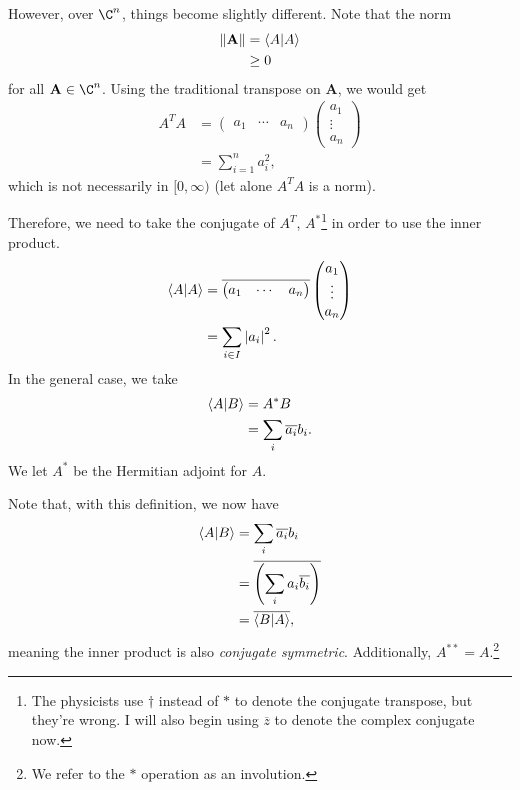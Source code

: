 \documentclass[10pt]{mypackage}
\begin{document}
However, over $\C^n$, things become slightly different. Note that the norm
\begin{align*}
  \norm{\mathbf{A}} &= \braket{A}{A}\\
                    &\geq 0
\end{align*}
for all $\mathbf{A}\in \C^n$. Using the traditional transpose on $\mathbf{A}$, we would get
\begin{align*}
  A^{T}A &= \begin{pmatrix}a_1 & \cdots & a_n\end{pmatrix} \begin{pmatrix}a_1 \\ \vdots \\ a_n\end{pmatrix}\\
         &= \sum_{i=1}^{n}a_i^2,
\end{align*}
which is not necessarily in $[0,\infty)$ (let alone $A^{T}A$ is a norm).\newline

Therefore, we need to take the conjugate of $A^{T}$, $A^{\ast}$\footnote{The physicists use $\dag$ instead of $\ast$ to denote the conjugate transpose, but they're wrong. I will also begin using $\overline{z}$ to denote the complex conjugate now.} in order to use the inner product.
\begin{align*}
  \braket{A}{A} &= \overline{\begin{pmatrix}a_1 & \cdots & a_n\end{pmatrix}} \begin{pmatrix}a_1\\\vdots\\a_n\end{pmatrix}\\
                &= \sum_{i\in I}\left\vert a_i \right\vert^2.
\end{align*}
In the general case, we take
\begin{align*}
  \braket{A}{B} &= A^{\ast}B\\
                &= \sum_{i}\overline{a_i}b_i.
\end{align*}
We let $A^{\ast}$ be the Hermitian adjoint for $A$.\newline

Note that, with this definition, we now have
\begin{align*}
  \braket{A}{B} &= \sum_{i}\overline{a_i}b_i\\
                &= \overline{\left(\sum_{i}a_i\overline{b_i}\right)}\\
                &= \overline{\braket{B}{A}},
\end{align*}
meaning the inner product is also \textit{conjugate symmetric}. Additionally, $A^{\ast\ast} = A$.\footnote{We refer to the $\ast$ operation as an involution.}\newline
\end{document}
